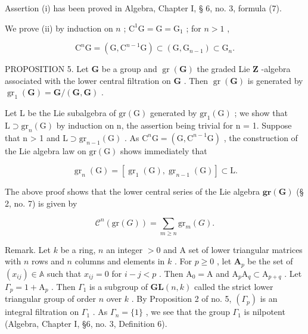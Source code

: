 Assertion (i) has been proved in Algebra, Chapter I, § 6, no. 3, formula (7).

We prove (ii) by induction on \(n\) ; \(\mathrm{C}^1\mathrm{G} = \mathrm{G} = \mathrm{G}_1\) ; for \(n > 1\) ,

\[
\mathrm{C} ^ {n} \mathrm{G} = (\mathrm{G}, \mathrm{C} ^ {n - 1} \mathrm{G}) \subset (\mathrm{G}, \mathrm{G} _ {n - 1}) \subset \mathrm{G} _ {n}.
\]

PROPOSITION 5. Let \(\mathbf{G}\) be a group and \(\operatorname{gr}(\mathbf{G})\) the graded Lie \(\mathbf{Z}\) -algebra associated with the lower central filtration on \(\mathbf{G}\) . Then \(\operatorname{gr}(\mathbf{G})\) is generated by \(\operatorname{gr}_1(\mathbf{G}) = \mathbf{G}/(\mathbf{G},\mathbf{G})\) .

Let L be the Lie subalgebra of \(\mathrm{gr}(\mathrm{G})\) generated by \(\mathrm{gr}_{1}(\mathrm{G})\) ; we show that \(\mathrm{L} \supset \mathrm{gr}_{n}(\mathrm{G})\) by induction on n, the assertion being trivial for n = 1. Suppose that n > 1 and \(\mathrm{L} \supset \mathrm{gr}_{n-1}(\mathrm{G})\) . As \(\mathrm{C}^{n}\mathrm{G} = (\mathrm{G}, \mathrm{C}^{n-1}\mathrm{G})\) , the construction of the Lie algebra law on \(\mathrm{gr}(\mathrm{G})\) shows immediately that

\[
\operatorname{gr} _ {n} (\mathrm{G}) = \left[ \operatorname{gr} _ {1} (\mathrm{G}), \operatorname{gr} _ {n - 1} (\mathrm{G}) \right] \subset \mathrm{L}.
\]

The above proof shows that the lower central series of the Lie algebra \(\mathbf{gr}(\mathbf{G})\) (§ 2, no. 7) is given by

\[
\mathcal {C} ^ {n} (\mathrm{gr} (G)) = \sum_ {m \geqslant n} \mathrm{gr} _ {m} (G).\tag{29}
\]

Remark. Let \(k\) be a ring, \(n\) an integer \(>0\) and A set of lower triangular matrices with \(n\) rows and \(n\) columns and elements in \(k\) . For \(p \geqslant 0\) , let \(\mathbf{A}_p\) be the set of \((x_{ij}) \in \mathbb{A}\) such that \(x_{ij} = 0\) for \(i - j < p\) . Then \(\mathrm{A}_0 = \mathrm{A}\) and \(\mathrm{A}_p\mathrm{A}_q \subset \mathrm{A}_{p + q}\) . Let \(\Gamma_p = 1 + \mathrm{A}_p\) . Then \(\Gamma_1\) is a subgroup of \(\mathbf{GL}(n,k)\) called the strict lower triangular group of order \(n\) over \(k\) . By Proposition 2 of no. 5, \((\Gamma_p)\) is an integral filtration on \(\Gamma_1\) . As \(\Gamma_n = \{1\}\) , we see that the group \(\Gamma_1\) is nilpotent (Algebra, Chapter I, §6, no. 3, Definition 6).

